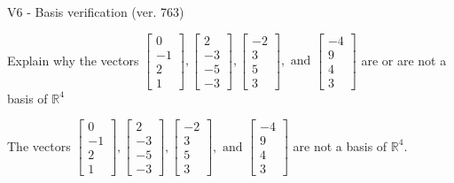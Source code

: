 \begin{exercise}
  \begin{exerciseTitle}V6 - Basis verification (ver. 763)\end{exerciseTitle}
  \begin{exerciseStatement}
    Explain why the vectors \(\left[\begin{array}{r}
0 \\
-1 \\
2 \\
1
\end{array}\right] , \left[\begin{array}{r}
2 \\
-3 \\
-5 \\
-3
\end{array}\right] , \left[\begin{array}{r}
-2 \\
3 \\
5 \\
3
\end{array}\right] , \text{ and } \left[\begin{array}{r}
-4 \\
9 \\
4 \\
3
\end{array}\right]\) are or are not a basis of \(\mathbb{R}^4\)	


  \end{exerciseStatement}
  \begin{exerciseAnswer}
   The vectors \(\left[\begin{array}{r}
0 \\
-1 \\
2 \\
1
\end{array}\right] , \left[\begin{array}{r}
2 \\
-3 \\
-5 \\
-3
\end{array}\right] , \left[\begin{array}{r}
-2 \\
3 \\
5 \\
3
\end{array}\right] , \text{ and } \left[\begin{array}{r}
-4 \\
9 \\
4 \\
3
\end{array}\right]\) 
  	 are not  a basis of \(\mathbb{R}^4\).
  


  \end{exerciseAnswer}
\end{exercise}